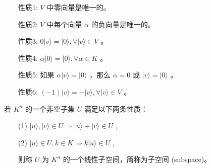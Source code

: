 \documentclass[a4paper,11pt,english]{sphinxmanual}
\begin{document}
\sphinxAtStartPar
  性质1:  \(V\) 中零向量是唯一的。

\sphinxAtStartPar
  性质2:  \(V\) 中每个向量  \(\alpha\) 的负向量是唯一的。

\sphinxAtStartPar
  性质3:  \(0|v\rangle=|0\rangle, \forall|v\rangle \in V\) 。

\sphinxAtStartPar
  性质4:  \(\alpha|0\rangle=|0\rangle, \forall \alpha \in K\) 。

\sphinxAtStartPar
  性质5: 如果  \(\alpha|v\rangle=|0\rangle\) ，那么  \(\alpha=0\) 或  \(|v\rangle=|0\rangle\) 。

\sphinxAtStartPar
  性质6:  \((-1)|v\rangle=-|v\rangle, \forall|v\rangle \in V\) 。

\sphinxAtStartPar
​若  \(K^{n}\) 的一个非空子集  \(U\) 满足以下两条性质：

\sphinxAtStartPar
  (1)  \(| {u}\rangle,| {v}\rangle \in U \Rightarrow| {u}\rangle+| {v}\rangle \in U\) ,

\sphinxAtStartPar
  (2)  \(| {u}\rangle \in U, k \in K \Rightarrow k| {u}\rangle \in U\) ,

\sphinxAtStartPar
​  则称  \(U\) 为  \(K^{n}\) 的一个线性子空间，简称为子空间 (subspace)。
\end{document}
